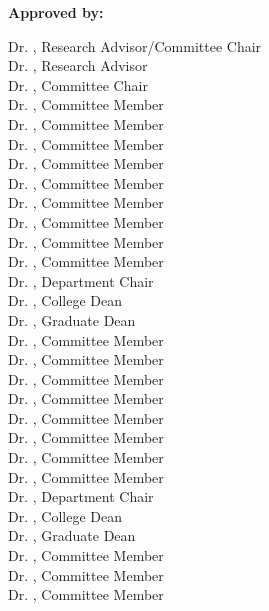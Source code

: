 \begin{titlepage}
\begin{center}
    \end{center}
    

\vfill

\textbf{Approved by:}


\vspace{.1cm}

\ifdefined\reschair
\noindent
Dr. \reschair, Research Advisor/Committee Chair\\
\else
\noindent
Dr. \resadv, Research Advisor \\
Dr. \comchair, Committee Chair\\
\fi
\ifdefined\commemi
\noindent
Dr. \commema, Committee Member\\
Dr. \commemb, Committee Member\\
Dr. \commemc, Committee Member\\
Dr. \commemd, Committee Member\\
Dr. \commeme, Committee Member\\
Dr. \commemf, Committee Member\\
Dr. \commemg, Committee Member\\
Dr. \commemh, Committee Member\\
Dr. \commemi, Committee Member\\
Dr. \depchair, Department Chair\\
Dr. \colldean, College Dean\\
Dr. \graddean, Graduate Dean\\
\else
\ifdefined\commemh
\noindent
Dr. \commema, Committee Member\\
Dr. \commemb, Committee Member\\
Dr. \commemc, Committee Member\\
Dr. \commemd, Committee Member\\
Dr. \commeme, Committee Member\\
Dr. \commemf, Committee Member\\
Dr. \commemg, Committee Member\\
Dr. \commemh, Committee Member\\
Dr. \depchair, Department Chair\\
Dr. \colldean, College Dean\\
Dr. \graddean, Graduate Dean\\
\else
\ifdefined\commemg
\noindent
Dr. \commema, Committee Member\\
Dr. \commemb, Committee Member\\
Dr. \commemc, Committee Member\\

\end{titlepage}
